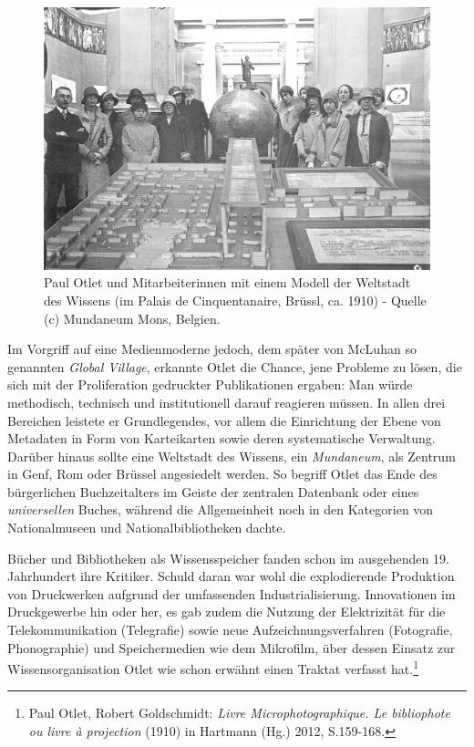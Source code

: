 \begin{figure}[htbp]
\centering
\includegraphics{img/Mundaneum2.png}
\caption{Paul Otlet und Mitarbeiterinnen mit einem Modell der Weltstadt
des Wissens (im Palais de Cinquentanaire, Brüssl, ca. 1910) - Quelle (c)
Mundaneum Mons, Belgien.}
\end{figure}

Im Vorgriff auf eine Medienmoderne jedoch, dem später von McLuhan so
genannten \emph{Global Village}, erkannte Otlet die Chance, jene
Probleme zu lösen, die sich mit der Proliferation gedruckter
Publikationen ergaben: Man würde methodisch, technisch und
institutionell darauf reagieren müssen. In allen drei Bereichen leistete
er Grundlegendes, vor allem die Einrichtung der Ebene von Metadaten in
Form von Karteikarten sowie deren systematische Verwaltung. Darüber
hinaus sollte eine Weltstadt des Wissens, ein \emph{Mundaneum}, als
Zentrum in Genf, Rom oder Brüssel angesiedelt werden. So begriff Otlet
das Ende des bürgerlichen Buchzeitalters im Geiste der zentralen
Datenbank oder eines \emph{universellen} Buches, während die
Allgemeinheit noch in den Kategorien von Nationalmuseen und
Nationalbibliotheken dachte.

Bücher und Bibliotheken als Wissensspeicher fanden schon im ausgehenden
19. Jahrhundert ihre Kritiker. Schuld daran war wohl die explodierende
Produktion von Druckwerken aufgrund der umfassenden Industrialisierung.
Innovationen im Druckgewerbe hin oder her, es gab zudem die Nutzung der
Elektrizität für die Telekommunikation (Telegrafie) sowie neue
Aufzeichnungsverfahren (Fotografie, Phonographie) und Speichermedien wie
dem Mikrofilm, über dessen Einsatz zur Wissensorganisation Otlet wie
schon erwähnt einen Traktat verfasst hat.\footnote{Paul Otlet, Robert
  Goldschmidt: \emph{Livre Microphotographique. Le bibliophote ou livre
  à projection} (1910) in Hartmann (Hg.) 2012, S.159-168.}


